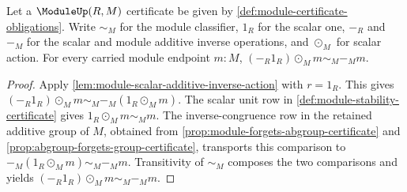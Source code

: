 \begin{theorem}\label{thm:module-minus-one-scalar-action-additive-inverse}
Let a $\ModuleUp(R,M)$ certificate be given by \autoref{def:module-certificate-obligations}. Write $\sim_M$ for the module classifier, $1_R$ for the scalar one, $-_R$ and $-_M$ for the scalar and module additive inverse operations, and $\odot_M$ for scalar action. For every carried module endpoint $m:M$, $(-_R1_R)\odot_M m\sim_M-_M m$.
\end{theorem}
\begin{proof}
Apply \autoref{lem:module-scalar-additive-inverse-action} with $r=1_R$. This gives $(-_R1_R)\odot_M m\sim_M-_M(1_R\odot_M m)$.
The scalar unit row in \autoref{def:module-stability-certificate} gives $1_R\odot_M m\sim_M m$.
The inverse-congruence row in the retained additive group of $M$, obtained from \autoref{prop:module-forgets-abgroup-certificate} and \autoref{prop:abgroup-forgets-group-certificate}, transports this comparison to $-_M(1_R\odot_M m)\sim_M-_M m$.
Transitivity of $\sim_M$ composes the two comparisons and yields $(-_R1_R)\odot_M m\sim_M-_M m$.
\end{proof}

